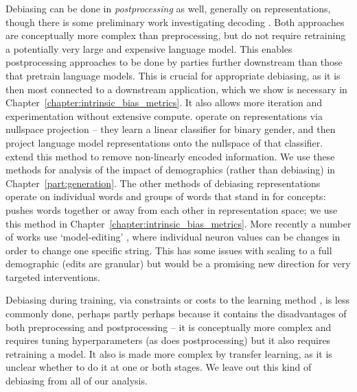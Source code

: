 Debiasing can be done in \textit{postprocessing} as well, generally on representations, though there is some preliminary work investigating decoding \citep{sheng-etal-2021-societal}. Both approaches are conceptually more complex than preprocessing, but do not require retraining a potentially very large and expensive language model. This enables postprocessing approaches to be done by parties further downstream than those that pretrain language models. This is crucial for appropriate debiasing, as it is then most connected to a downstream application, which we show is necessary in Chapter~\ref{chapter:intrinsic_bias_metrics}. It also allows more iteration and experimentation without extensive compute. \citet{ravfogel-etal-2020-null} operate on representations via nullspace projection -- they learn a linear classifier for binary gender, and then project language model representations onto the nullspace of that classifier. \citet{iskander-etal-2023-shielded} extend this method to remove non-linearly encoded information. We use these methods for analysis of the impact of demographics (rather than debiasing) in Chapter~\ref{part:generation}. The other methods of debiasing representations operate on individual words and groups of words that stand in for concepts: \citet{mrksic-etal-2017-semantic} pushes words together or away from each other in representation space; we use this method in Chapter~\ref{chapter:intrinsic_bias_metrics}. More recently a number of works use  `model-editing'  \citep{meng2022locating}, where individual neuron values can be changes in order to change one specific string. This has some issues with scaling to a full demographic (edits are granular) but would be a promising new direction for very targeted interventions.


Debiasing during training, via constraints or costs to the learning method \citep{zhao-etal-2017-men}, is less commonly done, perhaps partly perhaps because it contains the disadvantages of both preprocessing and postprocessing -- it is conceptually more complex and requires tuning hyperparameters (as does postprocessing) but it also requires retraining a model. It also is made more complex by transfer learning, as it is unclear whether to do it at one or both stages. We leave out this kind of debiasing from all of our analysis.


